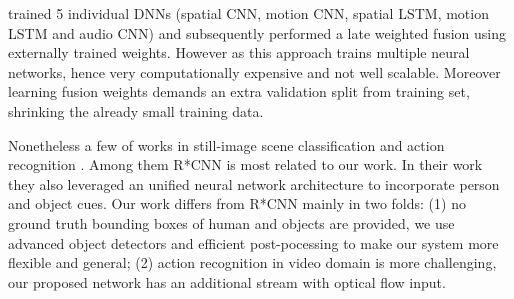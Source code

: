 \cite{WuJWYXW15} trained 5 individual DNNs (spatial CNN, motion CNN, spatial LSTM, motion LSTM and audio CNN) and subsequently performed a late weighted fusion using externally trained weights. 
However as this approach trains multiple neural networks, hence very computationally expensive and not well scalable.
Moreover learning fusion weights demands an extra validation split from training set, shrinking the already small training data.

Nonetheless a few of works in still-image scene classification and action recognition \cite{xiong2015recognize,gkioxari2015contextual}. 
Among them R*CNN \cite{gkioxari2015contextual} is most related to our work.
In their work they also leveraged an unified neural network architecture to incorporate person and object cues.
Our work differs from R*CNN mainly in two folds: (1) no ground truth bounding boxes of human and objects are provided, we use advanced object detectors and efficient post-pocessing to make our system more flexible and general; (2) action recognition in video domain is more challenging, our proposed network has an additional stream with optical flow input.
